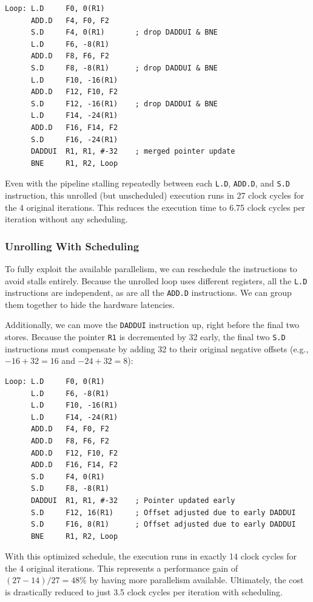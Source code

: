 \begin{lstlisting}[language={[x86masm]Assembler}]
Loop: L.D     F0, 0(R1)
      ADD.D   F4, F0, F2
      S.D     F4, 0(R1)       ; drop DADDUI & BNE
      L.D     F6, -8(R1)
      ADD.D   F8, F6, F2
      S.D     F8, -8(R1)      ; drop DADDUI & BNE
      L.D     F10, -16(R1)
      ADD.D   F12, F10, F2
      S.D     F12, -16(R1)    ; drop DADDUI & BNE
      L.D     F14, -24(R1)
      ADD.D   F16, F14, F2
      S.D     F16, -24(R1)
      DADDUI  R1, R1, #-32    ; merged pointer update
      BNE     R1, R2, Loop
\end{lstlisting}

Even with the pipeline stalling repeatedly between each \texttt{L.D}, \texttt{ADD.D}, and \texttt{S.D} instruction, this unrolled (but unscheduled) execution runs in 27 clock cycles for the 4 original iterations. This reduces the execution time to 6.75 clock cycles per iteration without any scheduling.

\subsubsection*{Unrolling With Scheduling}
To fully exploit the available parallelism, we can reschedule the instructions to avoid stalls entirely. Because the unrolled loop uses different registers, all the \texttt{L.D} instructions are independent, as are all the \texttt{ADD.D} instructions. We can group them together to hide the hardware latencies.

Additionally, we can move the \texttt{DADDUI} instruction up, right before the final two stores. Because the pointer \texttt{R1} is decremented by 32 early, the final two \texttt{S.D} instructions must compensate by adding 32 to their original negative offsets (e.g., \(-16 + 32 = 16\) and \(-24 + 32 = 8\)):

\begin{lstlisting}[language={[x86masm]Assembler}]
Loop: L.D     F0, 0(R1)
      L.D     F6, -8(R1)
      L.D     F10, -16(R1)
      L.D     F14, -24(R1)
      ADD.D   F4, F0, F2
      ADD.D   F8, F6, F2
      ADD.D   F12, F10, F2
      ADD.D   F16, F14, F2
      S.D     F4, 0(R1)
      S.D     F8, -8(R1)
      DADDUI  R1, R1, #-32    ; Pointer updated early
      S.D     F12, 16(R1)     ; Offset adjusted due to early DADDUI
      S.D     F16, 8(R1)      ; Offset adjusted due to early DADDUI
      BNE     R1, R2, Loop
\end{lstlisting}

With this optimized schedule, the execution runs in exactly 14 clock cycles for the 4 original iterations. This represents a performance gain of \((27-14)/27 = 48\%\) by having more parallelism available. Ultimately, the cost is drastically reduced to just 3.5 clock cycles per iteration with scheduling.

